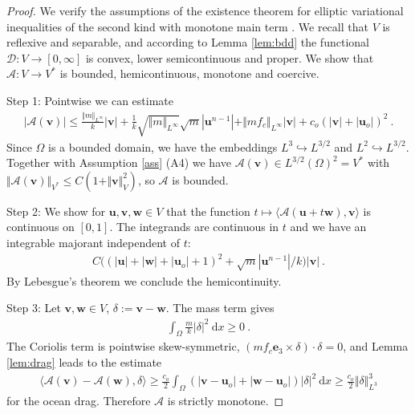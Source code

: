 \documentclass{article}
\theoremstyle{definition}
\newcommand{\bfu}{\boldsymbol{u}}
\newcommand{\bfv}{\boldsymbol{v}}
\newcommand{\bfw}{\boldsymbol{w}}
\newcommand{\bfe}{\boldsymbol{e}}
\newcommand{\D}{\mathcal{D}}
\newcommand{\dd}{\:\mathrm{d}}
\begin{document}
\begin{proof}
    We verify the assumptions of the existence theorem for elliptic variational inequalities
    of the second kind with monotone main term \cite[Theorem 54.A]{Z85}. We recall that $V$ is reflexive and separable, and according to Lemma \ref{lem:bdd} the functional $\D:V\rightarrow [0,\infty]$ is convex, lower semicontinuous and proper. We show that $\mathcal{A} : V \rightarrow V^{*}$
    is bounded, hemicontinuous, monotone and coercive.

    Step 1:
    Pointwise we can estimate
    \begin{align*}
        |\mathcal{A}(\bfv)| \leq \frac{\Vert m\Vert_{L^{\infty}}}{k} |\bfv| + \frac{1}{k} \sqrt{\Vert m\Vert_{L^{\infty}}} \sqrt{m} |\bfu^{n-1}| + \Vert m f_c\Vert_{L^{\infty}} |\bfv| +c_o (|\bfv|+|\bfu_o|)^{2} \ .
    \end{align*}
    Since $\Omega$ is a bounded domain, we have the embeddings $L^{3} \hookrightarrow L^{3/2}$ and $L^{2} \hookrightarrow L^{3/2}$. Together with Assumption \ref{ass} (A4) we have
    $\mathcal{A}(\bfv)\in L^{3/2}(\Omega)^2=V^*$ with $\Vert \mathcal{A}(\bfv)\Vert_{V^{*}} \leq C (1+\Vert \bfv\Vert^{2}_V)$, so $\mathcal{A}$ is bounded.

    Step 2: We show for $\bfu, \bfv, \bfw \in V$ that the function $t \mapsto \langle \mathcal{A}(\bfu +t \bfw),\bfv\rangle$ is continuous on $[0,1]$. The integrands are continuous in $t$ and we have an integrable majorant independent of $t$:
    \begin{align*}
        C\big((|\bfu| + |\bfw| +|\bfu_o|+1)^{2} + \sqrt{m}|\bfu^{n-1}|/k \big) |\bfv| \ .
    \end{align*}
    By Lebesgue's theorem we conclude the hemicontinuity.

    Step 3:
    Let $\bfv, \bfw\in V$, $\delta := \bfv-\bfw$. The mass term gives
    \begin{align*}
        \int_\Omega \frac m k |\delta|^{2} \dd x \geq 0 \ .
    \end{align*}
    The Coriolis term is pointwise skew-symmetric, $(mf_c\bfe_3 \times \delta) \cdot \delta =0$, and
    Lemma \ref{lem:drag} leads to the estimate
    \begin{align*}
        \langle \mathcal{A}(\bfv)-\mathcal{A}(\bfw), \delta\rangle \geq \frac{c_o}{2} \int_\Omega
        (|\bfv-\bfu_o|+|\bfw-\bfu_o|)|\delta|^2 \dd x \geq \frac{c_o}{2} \Vert\delta\Vert_{L^{3}}^3
      \end{align*}
    for the ocean drag. Therefore $\mathcal{A}$ is strictly monotone.


\end{proof}
\end{document}
